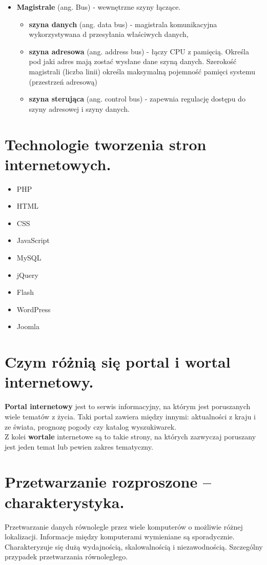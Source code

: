 \documentclass[12pt,a4paper]{article}
\begin{document}
\begin{itemize}
		\item \textbf{Magistrale} (ang. Bus) - wewnętrzne szyny łączące.
		\begin{itemize}
			\item \textbf{szyna danych} (ang. data bus) - magistrala komunikacyjna wykorzystywana d przesyłania właściwych danych,
			\item \textbf{szyna adresowa} (ang. address bus) - łączy CPU z pamięcią. Określa pod jaki adres mają zostać wysłane dane szyną danych. Szerokość magistrali (liczba linii) określa maksymalną pojemność pamięci systemu (przestrzeń adresową)
			\item \textbf{szyna sterująca} (ang. control bus) - zapewnia regulację dostępu do szyny adresowej i szyny danych.
		\end{itemize}
	\end{itemize}

	\section{Technologie tworzenia stron internetowych.}
		\begin{multicols}{2}
		\begin{itemize}
			\item PHP
			\item HTML
			\item CSS
			\item JavaScript
			\item MySQL
			\item jQuery
			\item Flash
			\item WordPress
			\item Joomla
		\end{itemize}
	\end{multicols}

	\section{Czym różnią się portal i wortal internetowy.}
	\textbf{Portal internetowy} jest to serwis informacyjny, na którym jest poruszanych wiele tematów z życia. Taki portal zawiera między innymi: aktualności z kraju i ze świata, prognozę pogody czy katalog wyszukiwarek.\\
	Z kolei \textbf{wortale} internetowe są to takie strony, na których zazwyczaj poruszany jest jeden temat lub pewien zakres tematyczny.

	\section{Przetwarzanie rozproszone – charakterystyka.}
	Przetwarzanie danych równolegle przez wiele komputerów o możliwie różnej lokalizacji. Informacje między komputerami wymieniane są sporadycznie. Charakteryzuje się dużą wydajnością, skalowalnością i niezawodnością. Szczególny przypadek przetwarzania równoległego.
\end{document}
